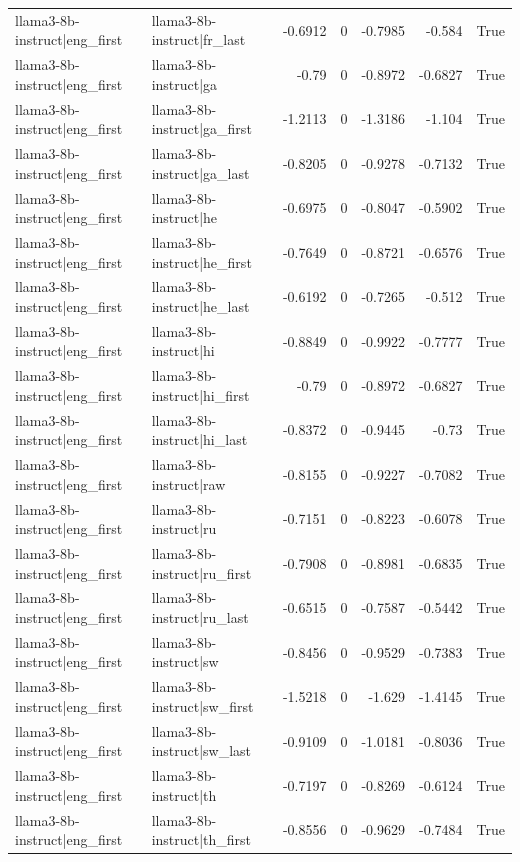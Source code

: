 \begin{table}
\begin{tabular}{l l r r r r l}
llama3-8b-instruct|eng_first & llama3-8b-instruct|fr_last & -0.6912 & 0 & -0.7985 & -0.584 & True \\
llama3-8b-instruct|eng_first & llama3-8b-instruct|ga & -0.79 & 0 & -0.8972 & -0.6827 & True \\
llama3-8b-instruct|eng_first & llama3-8b-instruct|ga_first & -1.2113 & 0 & -1.3186 & -1.104 & True \\
llama3-8b-instruct|eng_first & llama3-8b-instruct|ga_last & -0.8205 & 0 & -0.9278 & -0.7132 & True \\
llama3-8b-instruct|eng_first & llama3-8b-instruct|he & -0.6975 & 0 & -0.8047 & -0.5902 & True \\
llama3-8b-instruct|eng_first & llama3-8b-instruct|he_first & -0.7649 & 0 & -0.8721 & -0.6576 & True \\
llama3-8b-instruct|eng_first & llama3-8b-instruct|he_last & -0.6192 & 0 & -0.7265 & -0.512 & True \\
llama3-8b-instruct|eng_first & llama3-8b-instruct|hi & -0.8849 & 0 & -0.9922 & -0.7777 & True \\
llama3-8b-instruct|eng_first & llama3-8b-instruct|hi_first & -0.79 & 0 & -0.8972 & -0.6827 & True \\
llama3-8b-instruct|eng_first & llama3-8b-instruct|hi_last & -0.8372 & 0 & -0.9445 & -0.73 & True \\
llama3-8b-instruct|eng_first & llama3-8b-instruct|raw & -0.8155 & 0 & -0.9227 & -0.7082 & True \\
llama3-8b-instruct|eng_first & llama3-8b-instruct|ru & -0.7151 & 0 & -0.8223 & -0.6078 & True \\
llama3-8b-instruct|eng_first & llama3-8b-instruct|ru_first & -0.7908 & 0 & -0.8981 & -0.6835 & True \\
llama3-8b-instruct|eng_first & llama3-8b-instruct|ru_last & -0.6515 & 0 & -0.7587 & -0.5442 & True \\
llama3-8b-instruct|eng_first & llama3-8b-instruct|sw & -0.8456 & 0 & -0.9529 & -0.7383 & True \\
llama3-8b-instruct|eng_first & llama3-8b-instruct|sw_first & -1.5218 & 0 & -1.629 & -1.4145 & True \\
llama3-8b-instruct|eng_first & llama3-8b-instruct|sw_last & -0.9109 & 0 & -1.0181 & -0.8036 & True \\
llama3-8b-instruct|eng_first & llama3-8b-instruct|th & -0.7197 & 0 & -0.8269 & -0.6124 & True \\
llama3-8b-instruct|eng_first & llama3-8b-instruct|th_first & -0.8556 & 0 & -0.9629 & -0.7484 & True \\

\end{tabular}
\end{table}
